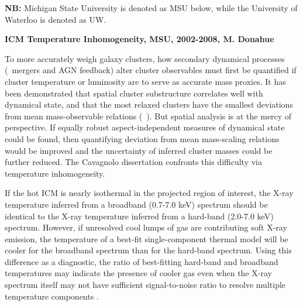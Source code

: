 \documentclass[12pt]{cv}
\begin{document}
{\bf{NB:}} Michigan State University is denoted as MSU below, while
the University of Waterloo is denoted as UW.

{\bfseries{ICM Temperature Inhomogeneity, MSU, 2002-2008, M. Donahue}}

To more accurately weigh galaxy clusters, how secondary dynamical
processes (\eg\ mergers and AGN feedback) alter cluster observables
must first be quantified if cluster temperature or luminosity are to
serve as accurate mass proxies. It has been demonstrated that spatial
cluster substructure correlates well with dynamical state, and that
the most relaxed clusters have the smallest deviations from mean
mass-observable relations (\eg\ \cite{VV08}). But spatial analysis
is at the mercy of perspective. If equally robust aspect-independent
measures of dynamical state could be found, then quantifying deviation
from mean mass-scaling relations would be improved and the uncertainty
of inferred cluster masses could be further reduced. The Cavagnolo
dissertation confronts this difficulty via temperature inhomogeneity.

If the hot ICM is nearly isothermal in the projected region of
interest, the X-ray temperature inferred from a broadband (0.7-7.0
keV) spectrum should be identical to the X-ray temperature inferred
from a hard-band (2.0-7.0 keV) spectrum. However, if unresolved cool
lumps of gas are contributing soft X-ray emission, the temperature of
a best-fit single-component thermal model will be cooler for the
broadband spectrum than for the hard-band spectrum. Using this
difference as a diagnostic, the ratio of best-fitting hard-band and
broadband temperatures may indicate the presence of cooler gas even
when the X-ray spectrum itself may not have sufficient signal-to-noise
ratio to resolve multiple temperature components \cite{me01}.
\end{document}
